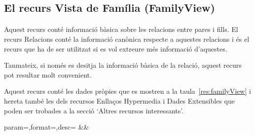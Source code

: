 \subsection{El recurs Vista de Família (FamilyView)}

    \paragraph{}
    Aquest recurs conté informació bàsica sobre les relacions entre pares i fills. El recurs Relacions conté la informació canònica respecte a aquestes relacions i és el recurs que ha de ser utilitzat si es vol extreure més informació d'aquestes.

    Tanmateix, si només es desitja la informació bàsica de la relació, aquest recurs pot resultar molt convenient.

    Aquest recurs conté les dades pròpies que es mostren a la taula~\ref{res:familyView} i hereta també les dels recursos Enllaços Hypermedia i Dades Extensibles que poden ser trobades a la secció `Altres recursos interessants'.

    \begin{center}
             {param=\param,format=\format,desc=\desc}
             {\param&\format&\desc}
     \end{center}
